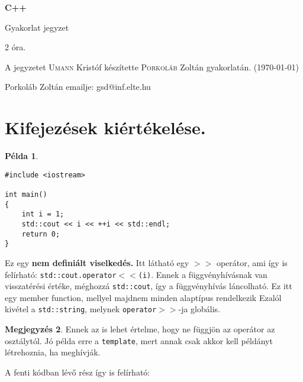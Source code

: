 \documentclass[a4paper,11.5pt]{article}
\begin{document}
	\setlength\parindent{0pt}
	\def\s{\hspace{0.2mm}\vphantom{\beta}}
	\def\Z{\mathbb{Z}}
	\def\Q{\mathbb{Q}}
	\def\R{\mathbb{R}}
	\def\C{\mathbb{C}}
	\def\N{\mathbb{N}}
	\def\Ra{\overline{\mathbb{R}}}
	
	\def\sume{\displaystyle\sum_{n=1}^{+\infty}}
	\def\sumn{\displaystyle\sum_{n=0}^{+\infty}}
	
	\def\narrow{\underset{n\rightarrow+\infty}{\longrightarrow}}
	\def\limn{\displaystyle\lim_{n\to +\infty}}
	\def\limx{\displaystyle\lim_{x\to +\infty}}
	
	\theoremstyle{definition}
	\newtheorem{theorem}{Tétel}[subsection] 
	
	\theoremstyle{definition}
	\newtheorem{definition}[theorem]{Definíció} 
	\newtheorem{example}[theorem]{Példa} 
	\newtheorem{task}[theorem]{Feladat} 
	\newtheorem{note}[theorem]{Megjegyzés}
	\begin{center}
		{\LARGE\textbf{C++}}
		
		{\Large Gyakorlat jegyzet}
		
		2 óra.
	\end{center}
	A jegyzetet \textsc{Umann} Kristóf készítette \textsc{Porkoláb} Zoltán  gyakorlatán. (\today)
	
	Porkoláb Zoltán emailje: gsd@inf.elte.hu
	
	\section{Kifejezések kiértékelése.}
	
	\begin{example}
		\begin{lstlisting}
#include <iostream>

int main()
{
	int i = 1;
	std::cout << i << ++i << std::endl;
	return 0;
}
		\end{lstlisting}
	\end{example}
	
	Ez egy \textbf{nem definiált viselkedés.} Itt látható egy \texttt{$>>$} operátor, ami így is felírható: \texttt{std::cout.operator$<<$(i)}. Ennek a függvényhívásnak van visszatérési értéke, méghozzá \texttt{std::cout}, így a függvényhívás láncolható. Ez itt egy member function, mellyel majdnem minden alaptípus  rendelkezik Ezalól kivétel a \texttt{std::string}, melynek \texttt{operator$>>$}-ja globális.
	\begin{note}
		Ennek az is lehet értelme, hogy ne függjön az operátor az osztálytól. Jó példa erre a \texttt{template}, mert annak csak akkor kell példányt létrehoznia, ha meghívják.
	\end{note}
	A fenti kódban lévő rész így is felírható:
	
\end{document}
